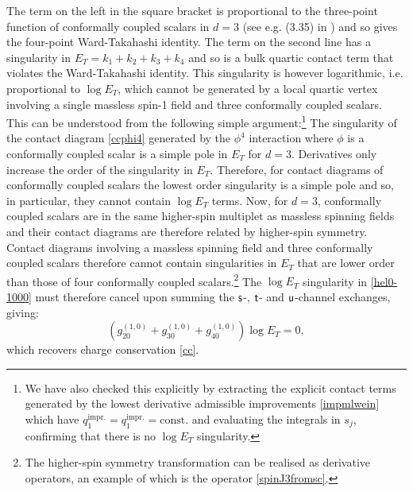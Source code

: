 \documentclass[11pt,a4paper]{article}
\begin{document}
The term on the left in the square bracket is proportional to the three-point function of conformally coupled scalars in $d=3$ (see e.g. (3.35) in \cite{Sleight:2019mgd}) and so gives the four-point Ward-Takahashi identity. The term on the second line has a singularity in $E_T = k_1+k_2+k_3+k_4$ and so is a bulk quartic contact term that violates the Ward-Takahashi identity. This singularity is however logarithmic, i.e. proportional to $\log E_T$, which cannot be generated by a local quartic vertex involving a single massless spin-1 field and three conformally coupled scalars. This can be understood from the following simple argument:\footnote{We have also checked this explicitly by extracting the explicit contact terms generated by the lowest derivative admissible improvements \eqref{impmlwein} which have $q^{\text{impr.}}_1=q^{\text{impr.}}_1=\text{const.}$ and evaluating the integrals in $s_j$, confirming that there is no $\log E_T$ singularity.} The singularity of the contact diagram \eqref{ccphi4} generated by the $\phi^4$ interaction where $\phi$ is a conformally coupled scalar is a simple pole in $E_T$ for $d=3$. Derivatives only increase the order of the singularity in $E_T$. Therefore, for contact diagrams of conformally coupled scalars the lowest order singularity is a simple pole and so, in particular, they cannot contain $\log E_T$ terms. Now, for $d=3$, conformally coupled scalars are in the same higher-spin multiplet as massless spinning fields \cite{Fradkin:1986ka} and their contact diagrams are therefore related by higher-spin symmetry. Contact diagrams involving a massless spinning field and three conformally coupled scalars therefore cannot contain singularities in $E_T$ that are lower order than those of four conformally coupled scalars.\footnote{The higher-spin symmetry transformation can be realised as derivative operators, an example of which is the operator \eqref{spinJ3fromsc}.} The $\log E_T$ singularity in \eqref{hel0-1000} must therefore cancel upon summing the ${\sf s}$-, ${\sf t}$- and ${\sf u}$-channel exchanges, giving:
\begin{equation}
    \left(g^{\left(1,0\right)}_{20}+g^{\left(1,0\right)}_{30}+g^{\left(1,0\right)}_{40}\right)\log E_T=0,
\end{equation}
which recovers charge conservation \eqref{cc}.
\end{document}
